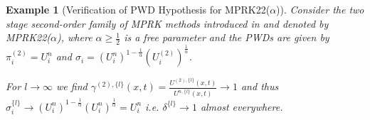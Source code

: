 \documentclass[final,11pt, times, linenumber, nopreprintline]{elsarticle}
\newtheorem{example}{Example}
\begin{document}
\begin{example}[Verification of PWD Hypothesis for MPRK22($\alpha$)]
    Consider the two stage second-order family of MPRK methods introduced in \cite{kopecz_order_2018} and denoted by MPRK22($\alpha$), where $\alpha\geq \frac12$ is a free parameter and the PWDs are given by $\pi_i^{(2)} = U_i^n$ and $\sigma_i = \left(U_i^n\right)^{1-\frac{1}{\alpha}}\left(U_i^{(2)}\right)^{\frac{1}{\alpha}}$.
    
    For $l \rightarrow \infty$ %
    we find $\gamma^{(2),\{l\}}(x,t) = \frac{U^{(2),\{l\}}(x,t)}{U^{n,\{l\}}(x,t)} \rightarrow 1$ and thus 
    $\sigma_i^{\{l\}} \rightarrow \left(U_i^n\right)^{1-\frac{1}{\alpha}}\left(U_i^n\right)^{\frac{1}{\alpha}} = U_i^n$ i.e. $\delta^{\{l\}} \rightarrow 1$ almost everywhere. 
\end{example}
\end{document}
